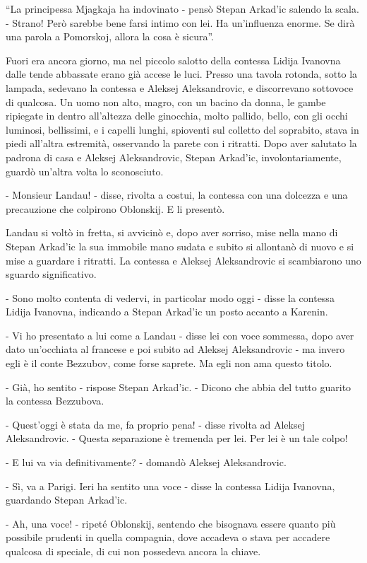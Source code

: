 ``La principessa Mjagkaja ha indovinato - pensò Stepan Arkad'ic salendo la scala. - Strano! Però sarebbe bene farsi intimo con lei. Ha un'influenza enorme. Se dirà una parola a Pomorskoj, allora la cosa è sicura''. 

Fuori era ancora giorno, ma nel piccolo salotto della contessa Lidija Ivanovna dalle tende abbassate erano già accese le luci. Presso una tavola rotonda, sotto la lampada, sedevano la contessa e Aleksej Aleksandrovic, e discorrevano sottovoce di qualcosa. Un uomo non alto, magro, con un bacino da donna, le gambe ripiegate in dentro all'altezza delle ginocchia, molto pallido, bello, con gli occhi luminosi, bellissimi, e i capelli lunghi, spioventi sul colletto del soprabito, stava in piedi all'altra estremità, osservando la parete con i ritratti. Dopo aver salutato la padrona di casa e Aleksej Aleksandrovic, Stepan Arkad'ic, involontariamente, guardò un'altra volta lo sconosciuto. 

- Monsieur Landau! - disse, rivolta a costui, la contessa con una dolcezza e una precauzione che colpirono Oblonskij. E li presentò. 

Landau si voltò in fretta, si avvicinò e, dopo aver sorriso, mise nella mano di Stepan Arkad'ic la sua immobile mano sudata e subito si allontanò di nuovo e si mise a guardare i ritratti. La contessa e Aleksej Aleksandrovic si scambiarono uno sguardo significativo. 

- Sono molto contenta di vedervi, in particolar modo oggi - disse la contessa Lidija Ivanovna, indicando a Stepan Arkad'ic un posto accanto a Karenin. 

- Vi ho presentato a lui come a Landau - disse lei con voce sommessa, dopo aver dato un'occhiata al francese e poi subito ad Aleksej Aleksandrovic - ma invero egli è il conte Bezzubov, come forse saprete. Ma egli non ama questo titolo. 

- Già, ho sentito - rispose Stepan Arkad'ic. - Dicono che abbia del tutto guarito la contessa Bezzubova. 

- Quest'oggi è stata da me, fa proprio pena! - disse rivolta ad Aleksej Aleksandrovic. - Questa separazione è tremenda per lei. Per lei è un tale colpo! 

- E lui va via definitivamente? - domandò Aleksej Aleksandrovic. 

- Sì, va a Parigi. Ieri ha sentito una voce - disse la contessa Lidija Ivanovna, guardando Stepan Arkad'ic. 

- Ah, una voce! - ripeté Oblonskij, sentendo che bisognava essere quanto più possibile prudenti in quella compagnia, dove accadeva o stava per accadere qualcosa di speciale, di cui non possedeva ancora la chiave. 

